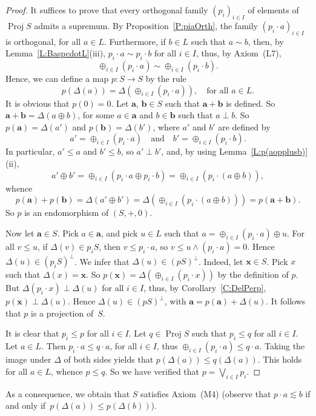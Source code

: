 \documentclass[psamsfonts,reqno]{memo-l}
\theoremstyle{plain}
\theoremstyle{definition}
\theoremstyle{remark}
\numberwithin{equation}{section}
\renewcommand{\iff}{if and only if}
\newcommand{\la}{\boldsymbol{a}}
\newcommand{\lb}{\boldsymbol{b}}
\newcommand{\lx}{\boldsymbol{x}}
\DeclareMathOperator{\BB}{Proj}
\newcommand{\DD}{\Delta}
\newcommand{\famm}[2]{(#1)_{#2}}
\begin{document}
\begin{proof}
It suffices to prove that every orthogonal family $\famm{p_i}{i\in I}$ of
elements of $\BB{S}$ admits a supremum. By Proposition~\ref{P:piaOrth},
the family $\famm{p_i\cdot a}{i\in I}$ is orthogonal, for all $a\in L$.
Furthermore, if $b\in L$ such that $a\sim b$, then, by
Lemma~\ref{L:BaspcdotL}(iii), $p_i\cdot a\sim p_i\cdot b$ for all $i\in I$,
thus, by Axiom~(L7),
   \[
   \oplus_{i\in I}(p_i\cdot a)\sim\oplus_{i\in I}(p_i\cdot b).
   \]
Hence, we can define a map $p\colon S\to S$ by the rule
   \[
   p(\DD(a))=\DD(\oplus_{i\in I}(p_i\cdot a)),\quad\text{for all }a\in L.
   \]
It is obvious that $p(0)=0$.
Let $\la$, $\lb\in S$ such that $\la+\lb$ is defined. So
$\la+\lb=\DD(a\oplus b)$, for some $a\in\la$ and $b\in\lb$ such that
$a\perp b$. So $p(\la)=\DD(a')$ and $p(\lb)=\DD(b')$, where $a'$ and $b'$
are defined by
   \[
   a'=\oplus_{i\in I}(p_i\cdot a)\quad\text{and}\quad
   b'=\oplus_{i\in I}(p_i\cdot b).
   \]
In particular, $a'\leq a$ and $b'\leq b$, so $a'\perp b'$, and, by using
Lemma~\ref{L:p(aopplusb)}(ii),
   \[
   a'\oplus b'=\oplus_{i\in I}(p_i\cdot a\oplus p_i\cdot b)
   =\oplus_{i\in I}(p_i\cdot(a\oplus b)),
   \]
whence
   \[
   p(\la)+p(\lb)=\DD(a'\oplus b')=\DD(\oplus_{i\in I}(p_i\cdot(a\oplus b)))
   =p(\la+\lb).
   \]
So $p$ is an endomorphism of $(S,+,0)$.

Now let $\la\in S$. Pick $a\in\la$, and pick $u\in L$ such that
$a=\oplus_{i\in I}(p_i\cdot a)\oplus u$. For all $v\leq u$, if
$\DD(v)\in p_iS$, then $v\leq p_i\cdot a$, so $v\leq u\wedge(p_i\cdot a)=0$.
Hence $\DD(u)\in(p_iS)^\bot$. We infer that $\DD(u)\in(pS)^\bot$.
Indeed, let $\lx\in S$. Pick $x$ such that $\DD(x)=\lx$.
So $p(\lx)=\DD(\oplus_{i\in I}(p_i\cdot x))$ by the definition of $p$.
But $\DD(p_i\cdot x)\perp\DD(u)$ for
all $i\in I$, thus, by Corollary~\ref{C:DelPerp}, $p(\lx)\perp\DD(u)$.
Hence $\DD(u)\in(pS)^\perp$, with $\la=p(\la)+\DD(u)$. It follows that $p$
is a projection of~$S$.

It is clear that $p_i\leq p$ for all $i\in I$. Let
$q\in\BB{S}$\index{pzzroj@$\BB{S}$} such that
$p_i\leq q$ for all $i\in I$. Let $a\in L$. Then $p_i\cdot a\leq q\cdot a$,
for all $i\in I$, thus $\oplus_{i\in I}(p_i\cdot a)\leq q\cdot a$. Taking
the image under $\DD$ of both sides yields that $p(\DD(a))\leq q(\DD(a))$.
This holds for all $a\in L$, whence $p\leq q$. So we have verified that
$p=\bigvee_{i\in I}p_i$.
\end{proof}

As a consequence, we obtain that $S$ satisfies Axiom~(M4) (observe that
$p\cdot a\lesssim b$ \iff\ $p(\DD(a))\leq p(\DD(b))$).
\end{document}
